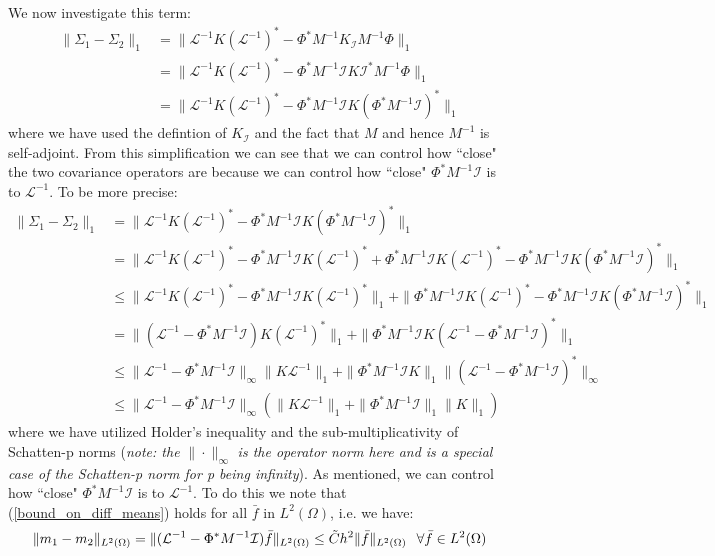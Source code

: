 We now investigate this term:
\begin{align*}
    \|\Sigma_{1}-\Sigma_2\|_{1}&=\|\mathcal{L}^{-1}K(\mathcal{L}^{-1})^{*}-\Phi^{*}M^{-1}K_{\mathcal{I}}M^{-1}\Phi\|_{1} \\
    &=\|\mathcal{L}^{-1}K(\mathcal{L}^{-1})^{*}-\Phi^{*}M^{-1}\mathcal{I}K\mathcal{I}^{*}M^{-1}\Phi\|_{1} \\
    &=\|\mathcal{L}^{-1}K(\mathcal{L}^{-1})^{*}-\Phi^{*}M^{-1}\mathcal{I}K(\Phi^{*}M^{-1}\mathcal{I})^{*}\|_{1}
\end{align*}
where we have used the defintion of $K_{\mathcal{I}}$ and the fact that $M$ and hence $M^{-1}$ is self-adjoint. From this simplification we can see that we can control how ``close" the two covariance operators are because we can control how ``close" $\Phi^{*}M^{-1}\mathcal{I}$ is to $\mathcal{L}^{-1}$. To be more precise:
\begin{align*}
    \|\Sigma_{1}-\Sigma_{2}\|_{1}&=\|\mathcal{L}^{-1}K(\mathcal{L}^{-1})^{*}-\Phi^{*}M^{-1}\mathcal{I}K(\Phi^{*}M^{-1}\mathcal{I})^{*}\|_{1} \\
    &=\|\mathcal{L}^{-1}K(\mathcal{L}^{-1})^{*}-\Phi^{*}M^{-1}\mathcal{I}K(\mathcal{L}^{-1})^{*}+\Phi^{*}M^{-1}\mathcal{I}K(\mathcal{L}^{-1})^{*}-\Phi^{*}M^{-1}\mathcal{I}K(\Phi^{*}M^{-1}\mathcal{I})^{*}\|_{1} \\
    &\leq\|\mathcal{L}^{-1}K(\mathcal{L}^{-1})^{*}-\Phi^{*}M^{-1}\mathcal{I}K(\mathcal{L}^{-1})^{*}\|_{1} + \|\Phi^{*}M^{-1}\mathcal{I}K(\mathcal{L}^{-1})^{*}-\Phi^{*}M^{-1}\mathcal{I}K(\Phi^{*}M^{-1}\mathcal{I})^{*}\|_{1} \\
    &= \|(\mathcal{L}^{-1}-\Phi^{*}M^{-1}\mathcal{I})K(\mathcal{L}^{-1})^{*}\|_{1} + \|\Phi^{*}M^{-1}\mathcal{I}K(\mathcal{L}^{-1}-\Phi^{*}M^{-1}\mathcal{I})^{*}\|_{1} \\
    &\leq\|\mathcal{L}^{-1}-\Phi^{*}M^{-1}\mathcal{I}\|_{\infty}\|K\mathcal{L}^{-1}\|_{1}+\|\Phi^{*}M^{-1}\mathcal{I}K\|_{1}\|(\mathcal{L}^{-1}-\Phi^{*}M^{-1}\mathcal{I})^{*}\|_{\infty} \\
    &\leq\|\mathcal{L}^{-1}-\Phi^{*}M^{-1}\mathcal{I}\|_{\infty}(\|K\mathcal{L}^{-1}\|_{1}+\|\Phi^{*}M^{-1}\mathcal{I}\|_{1}\|K\|_{1})
\end{align*}
where we have utilized Holder's inequality and the sub-multiplicativity of Schatten-p norms (\textit{note: the} $\|\cdot\|_{\infty}$ \textit{is the operator norm here and is a special case of the Schatten-p norm for p being infinity}). As mentioned, we can control how ``close" $\Phi^{*}M^{-1}\mathcal{I}$ is to $\mathcal{L}^{-1}$. To do this we note that (\ref{bound_on_diff_means}) holds for all $\bar{f}$ in $L^{2}(\Omega)$, i.e. we have:
\begin{equation*}
    \|m_1-m_2\|_{L^{2}(\Omega)}=\|(\mathcal{L}^{-1}-\Phi^{*}M^{-1}\mathcal{I})\bar{f}\|_{L^{2}(\Omega)}\leq \tilde{C}h^{2}\|\bar{f}\|_{L^2(\Omega)} \hspace{0.25cm} \forall\bar{f}\in L^{2}(\Omega)
\end{equation*}


